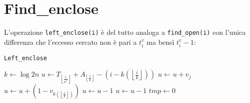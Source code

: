 \documentclass{article}
\begin{document}
\section{Find\_enclose}
L'operazione \texttt{left\_enclose(i)} è del tutto analoga a \texttt{find\_open(i)} con l'unica differenza che l'eccesso cercato non è pari a $t^v_i$ ma bensì $t^v_i-1$:
    \begin{algorithm}[H]
    \caption{\texttt{Left\_enclose}}\label{leftenclose}
    \begin{algorithmic}[1]
        \State $k\gets\log{2n}$
        \State $u\gets T_{\left\lfloor{\frac{i}{k^2}}\right\rfloor}+A_{\left\lfloor{\frac{i}{k}}\right\rfloor}-(i-k(\left\lfloor{\frac{i}{k}}\right\rfloor))$
            \State $u\gets u+v_j$
        \EndFor
        \State $u\gets u+(1-v_{k(\left\lfloor{\frac{i}{k}}\right\rfloor)})$
            \State $u\gets u-1$
        \EndIf
        \State $u\gets u-1$
        \State $tmp\gets 0$
    \end{algorithmic}
    \end{algorithm}
\end{document}
